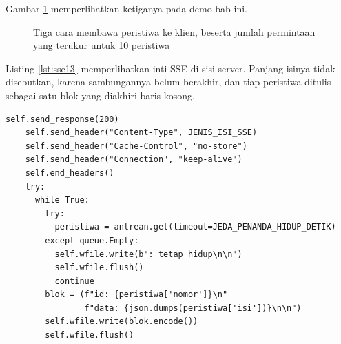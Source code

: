 Gambar \ref{fig:transport} memperlihatkan ketiganya pada demo bab ini.

\begin{figure}[!htb]
  \centering
  \caption{Tiga cara membawa peristiwa ke klien, beserta jumlah permintaan
           yang terukur untuk 10 peristiwa}
  \label{fig:transport}
\end{figure}

Listing \ref{lst:sse13} memperlihatkan inti SSE di sisi server. Panjang
isinya tidak disebutkan, karena sambungannya belum berakhir, dan tiap
peristiwa ditulis sebagai satu blok yang diakhiri baris kosong.

\begin{lstlisting}[style=PythonStyle, caption={Satu sambungan yang tetap terbuka, tersedia di \berkas{sources/chapter13/aplikasi.py}}, label={lst:sse13}]
    self.send_response(200)
    self.send_header("Content-Type", JENIS_ISI_SSE)
    self.send_header("Cache-Control", "no-store")
    self.send_header("Connection", "keep-alive")
    self.end_headers()
    try:
      while True:
        try:
          peristiwa = antrean.get(timeout=JEDA_PENANDA_HIDUP_DETIK)
        except queue.Empty:
          self.wfile.write(b": tetap hidup\n\n")
          self.wfile.flush()
          continue
        blok = (f"id: {peristiwa['nomor']}\n"
                f"data: {json.dumps(peristiwa['isi'])}\n\n")
        self.wfile.write(blok.encode())
        self.wfile.flush()
\end{lstlisting}

